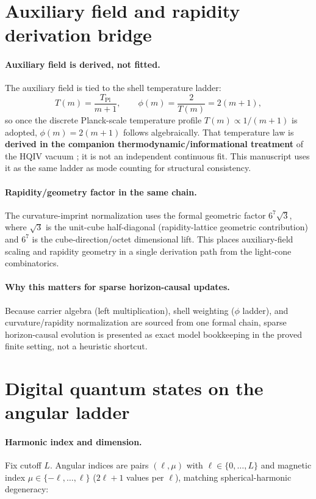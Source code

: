 \documentclass[11pt,a4paper]{article}
\theoremstyle{remark}
\begin{document}
\section{Auxiliary field and rapidity derivation bridge}

\paragraph{Auxiliary field is derived, not fitted.}
The auxiliary field is tied to the shell temperature ladder:
\[
  T(m)=\frac{T_{\mathrm{Pl}}}{m+1},\qquad
  \phi(m)=\frac{2}{T(m)}=2(m+1),
\]
so once the discrete Planck-scale temperature profile $T(m)\propto 1/(m+1)$ is adopted, $\phi(m)=2(m+1)$ follows algebraically. That temperature law is \textbf{derived in the companion thermodynamic/informational treatment} of the HQIV vacuum \cite{ettinger2026hqiv}; it is not an independent continuous fit. This manuscript uses it as the same ladder as mode counting for structural consistency.

\paragraph{Rapidity/geometry factor in the same chain.}
The curvature-imprint normalization uses the formal geometric factor $6^7\sqrt{3}$, where $\sqrt{3}$ is the unit-cube half-diagonal (rapidity-lattice geometric contribution) and $6^7$ is the cube-direction/octet dimensional lift. This places auxiliary-field scaling and rapidity geometry in a single derivation path from the light-cone combinatorics.

\paragraph{Why this matters for sparse horizon-causal updates.}
Because carrier algebra (left multiplication), shell weighting ($\phi$ ladder), and curvature/rapidity normalization are sourced from one formal chain, sparse horizon-causal evolution is presented as exact model bookkeeping in the proved finite setting, not a heuristic shortcut.

\section{Digital quantum states on the angular ladder}

\paragraph{Harmonic index and dimension.}
Fix cutoff $L$. Angular indices are pairs $(\ell,\mu)$ with $\ell\in\{0,\ldots,L\}$ and magnetic index $\mu\in\{-\ell,\ldots,\ell\}$ ($2\ell+1$ values per $\ell$), matching spherical-harmonic degeneracy:
\end{document}
